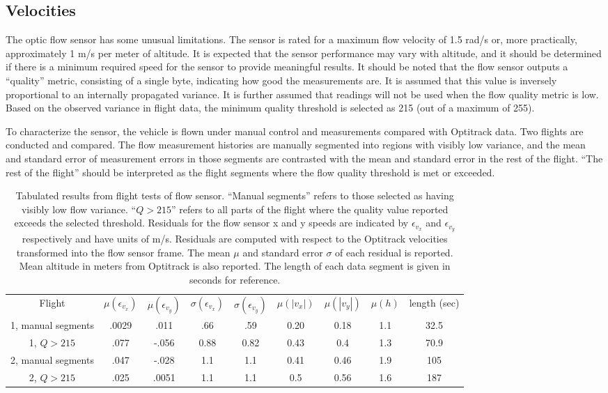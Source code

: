 \documentclass{article}
\begin{document}
\subsection{Velocities}

The optic flow sensor has some unusual limitations. The sensor is rated for a maximum flow velocity of 1.5 rad/s \cite{honegger2013} or, more practically, approximately 1 m/s per meter of altitude. It is expected that the sensor performance may vary with altitude, and it should be determined if there is a minimum required speed for the sensor to provide meaningful results. It should be noted that the flow sensor outputs a ``quality'' metric, consisting of a single byte, indicating how good the measurements are. It is assumed that this value is inversely proportional to an internally propagated variance. It is further assumed that readings will not be used when the flow quality metric is low. Based on the observed variance in flight data, the minimum quality threshold is selected as 215 (out of a maximum of 255).

To characterize the sensor, the vehicle is flown under manual control and measurements compared with Optitrack data. Two flights are conducted and compared. The flow measurement histories are manually segmented into regions with visibly low variance, and the mean and standard error of measurement errors in those segments are contrasted with the mean and standard error in the rest of the flight. ``The rest of the flight'' should be interpreted as the flight segments where the flow quality threshold is met or exceeded.

\begin{table}
\centering
\begin{tabular}{c|c|c|c|c|c|c|c|c}
Flight & $\mu(\epsilon_{v_x})$ & $\mu(\epsilon_{v_y})$ & $\sigma(\epsilon_{v_x})$ & $\sigma(\epsilon_{v_y})$ & $\mu(|v_x|)$ & $\mu(|v_y|)$ & $\mu(h)$ & length (sec)\\
1, manual segments & .0029 & .011 & .66 & .59 & 0.20 & 0.18 & 1.1 & 32.5\\
1, $Q > 215$ & .077 & -.056 & 0.88 & 0.82 & 0.43 & 0.4 & 1.3 & 70.9\\
2, manual segments & .047 & -.028 & 1.1 & 1.1 & 0.41 & 0.46 & 1.9 & 105 \\
2, $Q > 215$ & .025 & .0051 & 1.1 & 1.1 & 0.5 & 0.56 & 1.6 & 187
\end{tabular}
\caption{Tabulated results from flight tests of flow sensor. ``Manual segments'' refers to those selected as having visibly low flow variance. ``$Q > 215$'' refers to all parts of the flight where the quality value reported exceeds the selected threshold. Residuals for the flow sensor x  and y speeds are indicated by $\epsilon_{v_x}$ and $\epsilon_{v_y}$ respectively and have units of m/s. Residuals are computed with respect to the Optitrack velocities transformed into the flow sensor frame. The mean $\mu$ and standard error $\sigma$ of each residual is reported. Mean altitude in meters from Optitrack is also reported. The length of each data segment is given in seconds for reference.}
\label{tab:flight_data}
\end{table}
\end{document}
